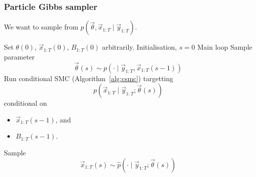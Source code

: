 \subsubsection{Particle Gibbs sampler}
We want to sample from $p(\vec \theta, \vec x_{1:T} \mid \vec y_{1:T})$.
    \begin{algorithmbis}\label{alg:pg}
        \begin{algorithmic}[1]
            \State Set $\theta(0)$, $\vec x_{1:T}(0)$, $B_{1:T}(0)$ arbitrarily. \Comment Initialisation, $s = 0$
             \Comment Main loop
                \State Sample parameter
                    $$\vec \theta(s) \sim p\left(\cdot \mid \vec y_{1:T}, \vec x_{1:T}(s - 1)\right)$$
                \State Run conditional SMC (Algorithm~\ref{alg:csmc}) targetting
                    $$p(\vec x_{1:T} \mid \vec y_{1:T}; \vec \theta(s))$$
                    conditional on
                    \begin{itemize}
                        \item $\vec x_{1:T}(s - 1)$, and
                        \item $B_{1:T}(s - 1)$.
                    \end{itemize}
                \State Sample
                    $$\vec x_{1:T}(s) \sim \hat p(\cdot \mid \vec y_{1:T}; \vec \theta(s))$$
            \EndFor
        \end{algorithmic}
    \end{algorithmbis}